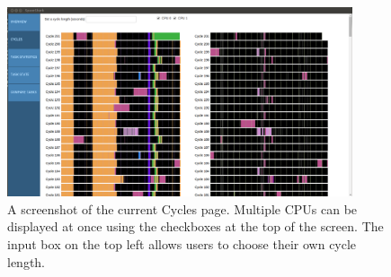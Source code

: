 \documentclass{hmcclinic}
\begin{document}
\begin{figure}[H]
\begin{center}
\includegraphics[width=4in]{cycles-page.png}
\caption{A screenshot of the current Cycles page. Multiple CPUs can be displayed
at once using the checkboxes at the top of the screen. The input box on the top
left allows users to choose their own cycle length.}
\end{center}
\end{figure}
\end{document}
